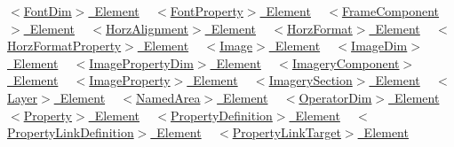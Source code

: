 \mbox{\hyperlink{fal_element_ref_fal_elem_ref_sec_12}{$<$\+Font\+Dim$>$ Element}} ~\newline
 \mbox{\hyperlink{fal_element_ref_fal_elem_ref_sec_13}{$<$\+Font\+Property$>$ Element}} ~\newline
 \mbox{\hyperlink{fal_element_ref_fal_elem_ref_sec_14}{$<$\+Frame\+Component$>$ Element}} ~\newline
 \mbox{\hyperlink{fal_element_ref_fal_elem_ref_sec_15}{$<$\+Horz\+Alignment$>$ Element}} ~\newline
 \mbox{\hyperlink{fal_element_ref_fal_elem_ref_sec_16}{$<$\+Horz\+Format$>$ Element}} ~\newline
 \mbox{\hyperlink{fal_element_ref_fal_elem_ref_sec_17}{$<$\+Horz\+Format\+Property$>$ Element}} ~\newline
 \mbox{\hyperlink{fal_element_ref_fal_elem_ref_sec_18}{$<$\+Image$>$ Element}} ~\newline
 \mbox{\hyperlink{fal_element_ref_fal_elem_ref_sec_19}{$<$\+Image\+Dim$>$ Element}} ~\newline
 \mbox{\hyperlink{fal_element_ref_fal_elem_ref_sec_imagepropertydim}{$<$\+Image\+Property\+Dim$>$ Element}} ~\newline
 \mbox{\hyperlink{fal_element_ref_fal_elem_ref_sec_20}{$<$\+Imagery\+Component$>$ Element}} ~\newline
 \mbox{\hyperlink{fal_element_ref_fal_elem_ref_sec_21}{$<$\+Image\+Property$>$ Element}} ~\newline
 \mbox{\hyperlink{fal_element_ref_fal_elem_ref_sec_22}{$<$\+Imagery\+Section$>$ Element}} ~\newline
 \mbox{\hyperlink{fal_element_ref_fal_elem_ref_sec_23}{$<$\+Layer$>$ Element}} ~\newline
 \mbox{\hyperlink{fal_element_ref_fal_elem_ref_sec_24}{$<$\+Named\+Area$>$ Element}} ~\newline
 \mbox{\hyperlink{fal_element_ref_fal_elem_ref_sec_operatordim}{$<$\+Operator\+Dim$>$ Element}} ~\newline
 \mbox{\hyperlink{fal_element_ref_fal_elem_ref_sec_25}{$<$\+Property$>$ Element}} ~\newline
 \mbox{\hyperlink{fal_element_ref_fal_elem_ref_sec_26}{$<$\+Property\+Definition$>$ Element}} ~\newline
 \mbox{\hyperlink{fal_element_ref_fal_elem_ref_sec_27}{$<$\+Property\+Link\+Definition$>$ Element}} ~\newline
 \mbox{\hyperlink{fal_element_ref_fal_elem_propertylinktarget}{$<$\+Property\+Link\+Target$>$ Element}} ~\newline
